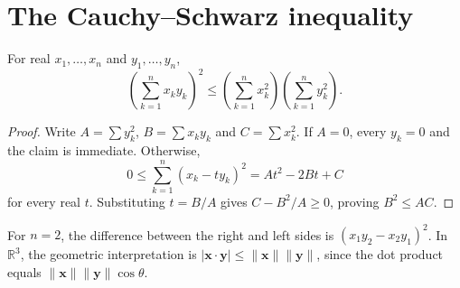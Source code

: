 \section{The Cauchy--Schwarz inequality}
\begin{theorem}
For real $x_1,\ldots,x_n$ and $y_1,\ldots,y_n$,
\[
\left(\sum_{k=1}^n x_ky_k\right)^2
\leq\left(\sum_{k=1}^n x_k^2\right)
     \left(\sum_{k=1}^n y_k^2\right).
\]
\end{theorem}
\begin{proof}
Write $A=\sum y_k^2$, $B=\sum x_ky_k$ and $C=\sum x_k^2$.
If $A=0$, every $y_k=0$ and the claim is immediate. Otherwise,
\[
0\leq\sum_{k=1}^n(x_k-ty_k)^2=At^2-2Bt+C
\]
for every real $t$. Substituting $t=B/A$ gives $C-B^2/A\geq0$, proving
$B^2\leq AC$.
\end{proof}
For $n=2$, the difference between the right and left sides is
$(x_1y_2-x_2y_1)^2$. In $\mathbb R^3$, the geometric interpretation is
$|\mathbf x\cdot\mathbf y|\leq\|\mathbf x\|\|\mathbf y\|$, since the dot
product equals $\|\mathbf x\|\|\mathbf y\|\cos\theta$.
